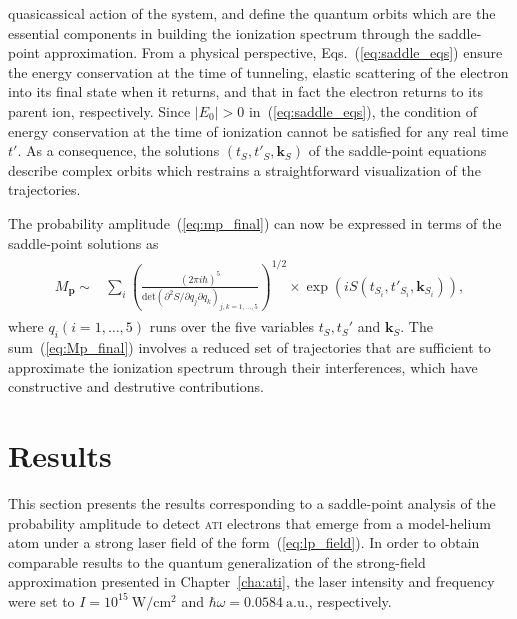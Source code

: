 quasicassical action of the system, and define the quantum orbits
which are the essential components in building the ionization spectrum
through the saddle-point approximation. From a physical perspective,
Eqs.~(\ref{eq:saddle_eqs}) ensure the energy conservation at the time
of tunneling, elastic scattering of the electron into its final state
when it returns, and that in fact the electron returns to its parent
ion, respectively. Since $|E_{0}| > 0$ in~(\ref{eq:saddle_eqs}), the
condition of energy conservation at the time of ionization cannot be
satisfied for any real time $t'$. As a consequence, the solutions
$(t_{S}, t'_{S}, \mathbf{k}_{S})$ of the saddle-point equations
describe complex orbits which restrains a straightforward
visualization of the trajectories.

The probability amplitude~(\ref{eq:mp_final}) can now be expressed in
terms of the saddle-point solutions as~\cite{KopoldOptComm2000}
\begin{eqnarray}
\label{eq:Mp_final}
\begin{split}
M_{\mathbf{p}} \sim & \sum\limits_{i} \left( \frac{(2\pi i \hbar)^{5}}
{\mathrm{det} (\partial^{2}S / \partial q_{j} \partial q_{k})_{j,k = 1, \dots, 5}}
\right)^{1/2} \times \exp(i S(t_{S_{i}}, t'_{S_{i}}, \mathbf{k}_{S_{i}})),
\end{split}
\end{eqnarray}
where $q_{i}(i = 1,\dots,5)$ runs over the five variables $t_{S},
t_{S}'$ and $\mathbf{k}_{S}$. The sum~(\ref{eq:Mp_final}) involves a
reduced set of trajectories that are sufficient to approximate the
ionization spectrum through their interferences, which have
constructive and destrutive contributions.


\section{\label{sec:spa_results} Results}

This section presents the results corresponding to a saddle-point
analysis of the probability amplitude to detect \textsc{ati} electrons
that emerge from a model-helium atom under a strong laser field of the
form~(\ref{eq:lp_field}). In order to obtain comparable results to the
quantum generalization of the strong-field approximation presented in
Chapter~\ref{cha:ati}, the laser intensity and frequency were set to
$I = 10^{15}\ \mathrm{W/cm^{2}}$ and $\hbar\omega =
0.0584\ \mathrm{a.u.}$, respectively.

